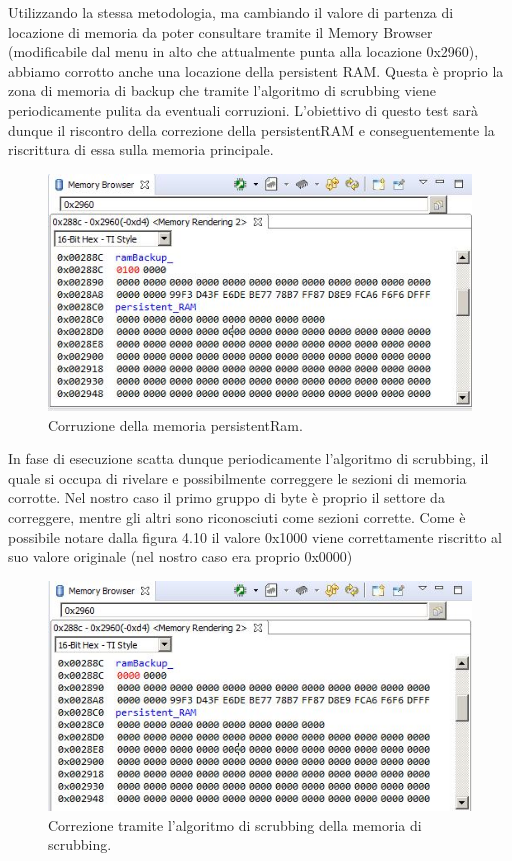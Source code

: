 \documentclass[LaM,binding=0.6cm]{../sapthesis}
\begin{document}
Utilizzando la stessa metodologia, ma cambiando il valore di partenza di locazione di memoria da poter consultare tramite il Memory Browser (modificabile dal menu in alto che attualmente punta alla locazione 0x2960), abbiamo corrotto anche una locazione della persistent RAM. 
Questa è proprio la zona di memoria di backup che tramite l'algoritmo di scrubbing viene periodicamente pulita da eventuali corruzioni. L'obiettivo di questo test sarà dunque il riscontro della correzione della persistentRAM e conseguentemente la riscrittura di essa sulla memoria principale.
\begin{figure}[htbp]
\centerline{\includegraphics[scale=0.8]{examples/5_PersistentRamCorruzione.JPG}}
\caption{Corruzione della memoria persistentRam.}
\label{fig}
\end{figure}
\newline
In fase di esecuzione scatta dunque periodicamente l'algoritmo di scrubbing, il quale si occupa di rivelare e possibilmente correggere le sezioni di memoria corrotte. Nel nostro caso il primo gruppo di byte è proprio il settore da correggere, mentre gli altri sono riconosciuti come sezioni corrette. Come è possibile notare dalla figura 4.10 il valore 0x1000 viene correttamente riscritto al suo valore originale (nel nostro caso era proprio 0x0000)

\begin{figure}[htbp]
\centerline{\includegraphics[scale=0.8]{examples/6_ScrubbingPersistentRamRiuscita.JPG}}
\caption{Correzione tramite l'algoritmo di scrubbing della memoria di scrubbing.}
\label{fig}
\end{figure}
\vspace{0.5cm}
\end{document}
